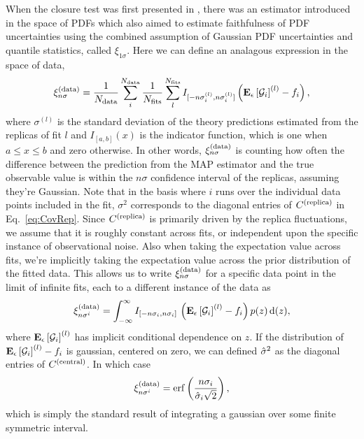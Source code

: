 When the closure test was first presented in \cite{nnpdf30}, there was an estimator
introduced in the space of PDFs which also aimed to estimate faithfulness of
PDF uncertainties using the combined assumption of Gaussian PDF uncertainties
and quantile statistics, called $\xi_{1\sigma}$. Here we can define an
analagous expression in the space of data,
\begin{equation}
    \label{eq:XiDataDef}
    \xi^{(\rm data)}_{n \sigma} = 
        \frac{1}{N_{\rm data}} \sum_{i}^{N_{\rm data}} 
        \frac{1}{N_{\rm fits}} \sum_{l}^{N_{\rm fits}}
            I_{[-n\sigma_i^{(l)}, n\sigma_i^{(l)}]}
            \left( \mathbf{E}_{\epsilon}\left[ \mathcal{G}_i \right]^{(l)} - f_i \right),
\end{equation}
where $\sigma^{(l)}$ is the standard deviation of the theory predictions
estimated from the replicas of fit $l$ and $I_{[a, b]}(x)$ is the indicator
function, which is one when $a \leq x \leq b$ and zero otherwise. In other
words, $\xi^{(\rm data)}_{n \sigma}$ is counting how often the difference between the prediction
from the MAP estimator and the true observable value is within the $n\sigma$
confidence interval of the replicas, assuming they're Gaussian. Note that
in the basis where $i$ runs over the individual data points included in the fit,
$\sigma^2$ corresponds to the diagonal entries of $C^{(\rm replica)}$ in
Eq.~\ref{eq:CovRep}. Since $C^{(\rm replica)}$ is primarily driven by the replica
fluctuations, we assume that it is roughly constant across fits, or independent
upon the specific instance of observational noise. Also when taking the expectation
value across fits, we're implicitly taking the expectation value across
the prior distribution of the fitted data. This allows us to write
$\xi^{(\rm data)}_{n \sigma}$ for a specific data point in the limit of infinite fits, each to
a different instance of the data as
\begin{equation}
    \label{eq:XiIExpecVel}
    \xi^{(\rm data)}_{n {\sigma^i}} = 
    \int_{-\infty}^{\infty} I_{[-n \sigma_i, n \sigma_i]}\,
    \left( \mathbf{E}_{\epsilon}\left[ \mathcal{G}_i \right]^{(l)} - f_i \right) 
    p(z)\, 
    {\rm d}(z),
\end{equation}
where $\mathbf{E}_{\epsilon}\left[ \mathcal{G}_i \right]^{(l)}$ has implicit conditional dependence on $z$. If
the distribution of $\mathbf{E}_{\epsilon}\left[ \mathcal{G}_i \right]^{(l)} - f_i$ is gaussian, centered on
zero, we can defined $\hat{\sigma}^2$ as the diagonal entries of $C^{(\rm central)}$. In
which case
\begin{equation}
    \label{eq:expectedxi}
    \xi^{(\rm data)}_{n {\sigma^i}} = 
    {\rm erf} \left( \frac{n \sigma_i}{\hat{\sigma}_i \sqrt{2}}\right),
\end{equation}
which is simply the standard result of integrating a gaussian over some finite
symmetric interval.


